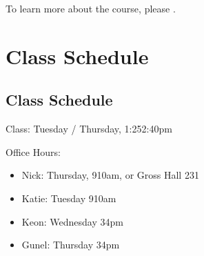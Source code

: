 \documentclass[letterpaper,10pt,english]{jupyterBook}
\begin{document}
\sphinxAtStartPar
To learn more about the course, please .

\sphinxstepscope


\part{Class Schedule}

\sphinxstepscope


\chapter{Class Schedule}
\label{\detokenize{00_class_schedule/class_schedule:class-schedule}}\label{\detokenize{00_class_schedule/class_schedule::doc}}
\sphinxAtStartPar
Class: Tuesday / Thursday, 1:25\sphinxhyphen{}2:40pm

\sphinxAtStartPar
Office Hours:
\begin{itemize}
\item {} 
\sphinxAtStartPar
Nick: Thursday, 9\sphinxhyphen{}10am,  or Gross Hall 231

\item {} 
\sphinxAtStartPar
Katie: Tuesday 9\sphinxhyphen{}10am 

\item {} 
\sphinxAtStartPar
Keon: Wednesday 3\sphinxhyphen{}4pm 

\item {} 
\sphinxAtStartPar
Gunel: Thursday 3\sphinxhyphen{}4pm 

\end{itemize}
\end{document}
